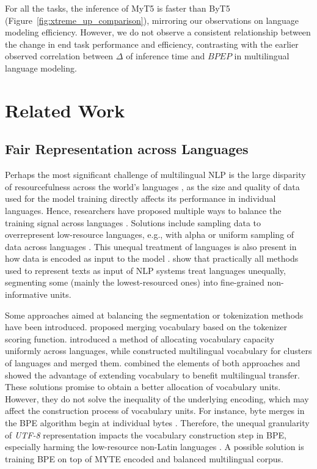 For all the tasks, the inference of MyT5 is faster than ByT5 (Figure~\ref{fig:xtreme_up_comparison}), mirroring our observations on language modeling efficiency. However, we do not observe a consistent relationship between the change in end task performance and efficiency, contrasting with the earlier observed correlation between $\Delta$ of inference time and $BPEP$ in multilingual language modeling. 

\section{Related Work}

\subsection{Fair Representation across Languages}

Perhaps the most significant challenge of multilingual NLP is the large disparity of resourcefulness across the world's languages \cite{joshi-etal-2020-state}, as the size and quality of data used for the model training directly affects its performance in individual languages. Hence, researchers have proposed multiple ways to balance the training signal across languages \cite{malkin-etal-2022-balanced}. Solutions include sampling data to overrepresent low-resource languages, e.g., with alpha \cite{conneau-etal-2020-unsupervised} or uniform sampling of data across languages \cite{chung2023unimax}. This unequal treatment of languages is also present in how data is encoded as input to the model \cite{ahia_all_2023}. 
\citet{petrov_language_2023} show that practically all methods used to represent texts as input of NLP systems treat languages unequally, segmenting some (mainly the lowest-resourced ones) into fine-grained non-informative units.

Some approaches aimed at balancing the segmentation or tokenization methods have been introduced.
\citet{limisiewicz-etal-2023-tokenization} proposed merging vocabulary based on the tokenizer scoring function.
\citet{zheng_allocating_2021} introduced a method of allocating vocabulary capacity uniformly across languages, while \citet{chung_improving_2020} constructed multilingual vocabulary for clusters of languages and merged them. 
\citet{liang-etal-2023-xlm} combined the elements of both approaches and showed the advantage of extending vocabulary to benefit multilingual transfer. These solutions promise to obtain a better allocation of vocabulary units. However, they do not solve the inequality of the underlying encoding, which may affect the construction process of vocabulary units. For instance, byte merges in the BPE algorithm begin at individual bytes \citet{sennrich_neural_2016, zouhar-etal-2023-formal}. Therefore, the unequal granularity of \emph{UTF-8} representation impacts the vocabulary construction step in BPE, especially harming the low-resource non-Latin languages \cite{kargaran-etal-2024-glotscript-resource}. A possible solution is training BPE on top of \textsc{MYTE} encoded and balanced multilingual corpus.

